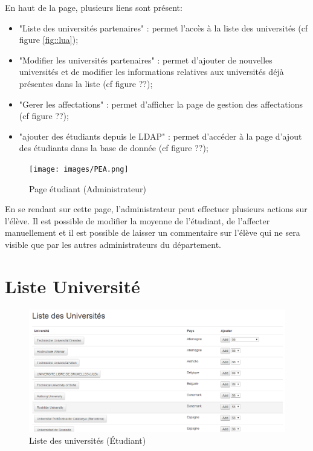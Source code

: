 En haut de la page, plusieurs liens sont présent:
\begin{itemize}
	\item "Liste des universités partenaires" : permet l'accès à la liste des universités (cf figure \ref{fig::lua});
	\item "Modifier les universités partenaires" : permet d'ajouter de nouvelles universités et de modifier les informations relatives aux universités déjà présentes dans la liste (cf figure ??);
	\item "Gerer les affectations" : permet d'afficher la page de gestion des affectations (cf figure ??);
	\item "ajouter des étudiants depuis le LDAP" : permet d'accéder à la page d'ajout des étudiants dans la base de donnée (cf figure ??);

\end{itemize} 

\bigbreak

\begin{figure}[H]
	\texttt{[image: images/PEA.png]}
	\caption{Page étudiant (Administrateur)}
	\label{fig::pea}
\end{figure}

En se rendant sur cette page, l'administrateur peut effectuer plusieurs actions sur l'élève. Il est possible de modifier la moyenne de l'étudiant, de l'affecter manuellement et il est possible de laisser un commentaire sur l'élève qui ne sera visible que par les autres administrateurs du département.

\newpage
\section{Liste Université}

\bigbreak

\begin{figure}[H]
	\includegraphics[scale=0.35]{images/LUS.png}
	\caption{Liste des universités (Étudiant)}
	\label{fig::lus}
\end{figure}

